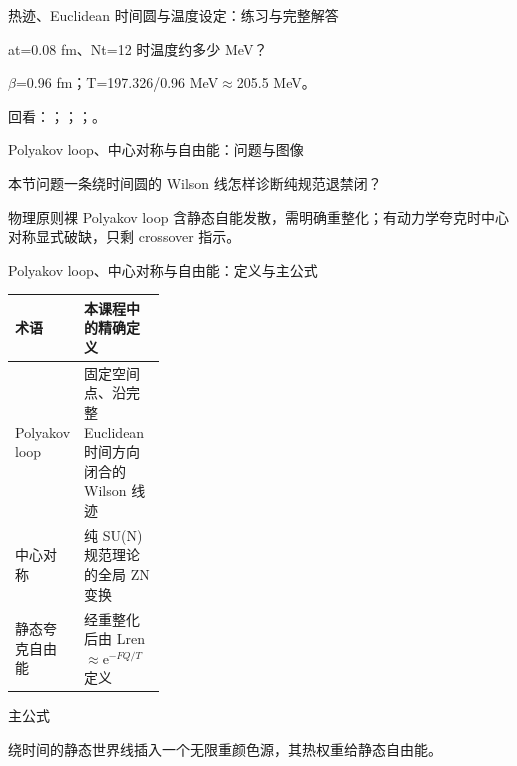 \begin{frame}[t]{热迹、Euclidean 时间圆与温度设定：练习与完整解答}
\footnotesize
\begin{block}{}at=0.08 fm、Nt=12 时温度约多少 MeV？\end{block}
\begin{exampleblock}{}\ensuremath{\beta}=0.96 fm；T=197.326/\allowbreak{}0.96 MeV\ensuremath{\approx}205.5 MeV。\end{exampleblock}
\vfill
\scriptsize 回看：；；；。
\end{frame}

\begin{frame}[t]{Polyakov loop、中心对称与自由能：问题与图像}
\footnotesize
\begin{block}{本节问题}一条绕时间圆的 Wilson 线怎样诊断纯规范退禁闭？\end{block}
\begin{block}{物理原则}\quad 裸 Polyakov loop 含静态自能发散，需明确重整化；有动力学夸克时中心对称显式破缺，只剩 crossover 指示。\end{block}
\end{frame}

\begin{frame}[t]{Polyakov loop、中心对称与自由能：定义与主公式}
\footnotesize\begin{tabularx}{\linewidth}{p{0.30\linewidth}Y}
\toprule 术语 & 本课程中的精确定义\\\midrule
{} Polyakov loop & 固定空间点、沿完整 Euclidean 时间方向闭合的 Wilson 线迹\\
 中心对称 & 纯 SU(N) 规范理论的全局 ZN 变换\\
 静态夸克自由能 & 经重整化后由 Lren\ensuremath{\approx}e\ensuremath{^{-FQ/T}} 定义\\
\bottomrule\end{tabularx}\vspace{0.15cm}
\begin{block}{ 主公式}\centering{}\end{block}
绕时间的静态世界线插入一个无限重颜色源，其热权重给静态自由能。
\end{frame}

